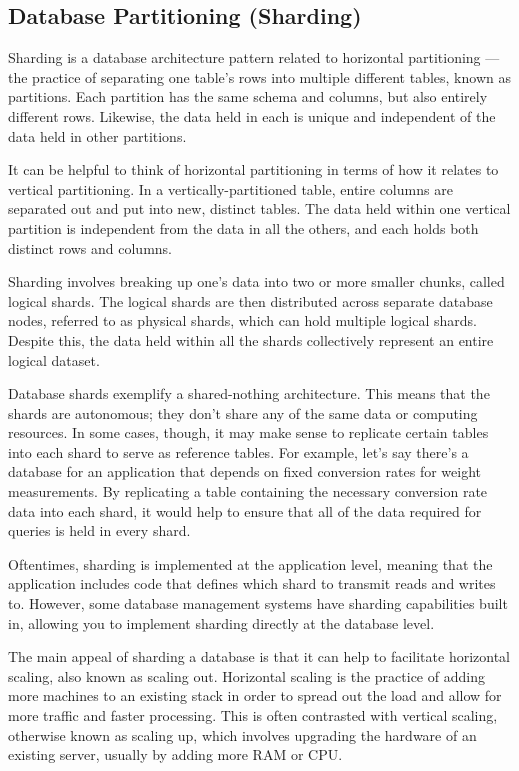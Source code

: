 \documentclass[a4paper, 11.25pt]{article}
\begin{document}
\subsection{Database Partitioning (Sharding)}
Sharding is a database architecture pattern related to horizontal partitioning — the practice of separating one table’s rows into multiple different tables, known as partitions. Each partition has the same schema and columns, but also entirely different rows. Likewise, the data held in each is unique and independent of the data held in other partitions.

It can be helpful to think of horizontal partitioning in terms of how it relates to vertical partitioning. In a vertically-partitioned table, entire columns are separated out and put into new, distinct tables. The data held within one vertical partition is independent from the data in all the others, and each holds both distinct rows and columns.

Sharding involves breaking up one’s data into two or more smaller chunks, called logical shards. The logical shards are then distributed across separate database nodes, referred to as physical shards, which can hold multiple logical shards. Despite this, the data held within all the shards collectively represent an entire logical dataset.

Database shards exemplify a shared-nothing architecture. This means that the shards are autonomous; they don’t share any of the same data or computing resources. In some cases, though, it may make sense to replicate certain tables into each shard to serve as reference tables. For example, let’s say there’s a database for an application that depends on fixed conversion rates for weight measurements. By replicating a table containing the necessary conversion rate data into each shard, it would help to ensure that all of the data required for queries is held in every shard.

Oftentimes, sharding is implemented at the application level, meaning that the application includes code that defines which shard to transmit reads and writes to. However, some database management systems have sharding capabilities built in, allowing you to implement sharding directly at the database level.

The main appeal of sharding a database is that it can help to facilitate horizontal scaling, also known as scaling out. Horizontal scaling is the practice of adding more machines to an existing stack in order to spread out the load and allow for more traffic and faster processing. This is often contrasted with vertical scaling, otherwise known as scaling up, which involves upgrading the hardware of an existing server, usually by adding more RAM or CPU.
\end{document}

